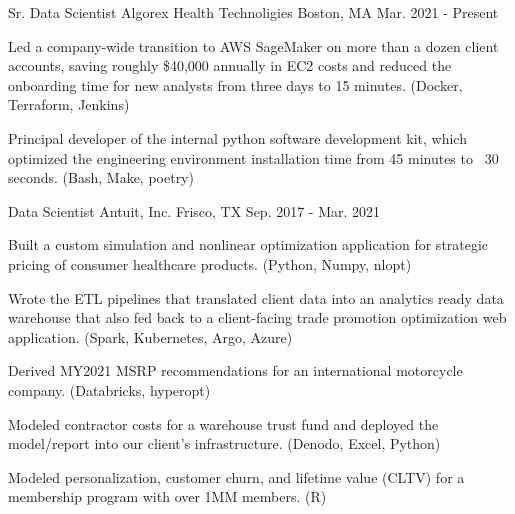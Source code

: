 

\begin{cventries}

  \cventry
    {Sr. Data Scientist} %
    {Algorex Health Technoligies} %
    {Boston, MA} %
    {Mar. 2021 - Present} %
    {
      \begin{cvitems} %
      \item {Led a company-wide transition to AWS SageMaker on more
          than a dozen client accounts, saving roughly \$40,000
          annually in EC2 costs and reduced the onboarding time for
          new analysts from three days to 15 minutes. (Docker, Terraform, Jenkins)}
      \item {Principal developer of the internal python software
          development kit, which optimized the engineering environment
          installation time from 45 minutes to ~30 seconds. (Bash, Make, poetry)}
      \end{cvitems}
    }

  \cventry
    {Data Scientist} %
    {Antuit, Inc.} %
    {Frisco, TX} %
    {Sep. 2017 - Mar. 2021} %
    {
      \begin{cvitems} %
      \item {Built a custom simulation and nonlinear optimization
          application for strategic pricing of consumer healthcare
          products. (Python, Numpy, nlopt)}
      \item {Wrote the ETL pipelines that translated client data into
          an analytics ready data warehouse that also fed back to a
          client-facing trade promotion optimization web
          application. (Spark, Kubernetes, Argo, Azure) }
      \item {Derived MY2021 MSRP recommendations for an
          international motorcycle company. (Databricks, hyperopt)}
      \item {Modeled contractor costs for a warehouse trust fund and
          deployed the model/report into our client's
          infrastructure. (Denodo, Excel, Python)}
      \item {Modeled personalization, customer churn, and lifetime value
          (CLTV) for a membership program with over 1MM members. (R)}
      \end{cvitems}
    }

\end{cventries}
